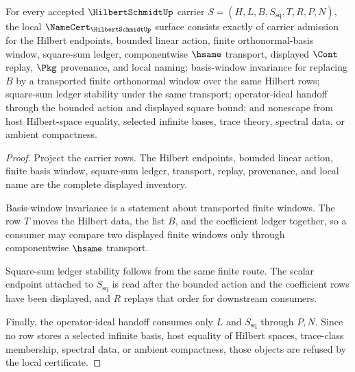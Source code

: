 \begin{theorem}
\label{thm:hilbert-schmidt-namecert-obligations}
For every accepted $\HilbertSchmidtUp$ carrier $S=(H,L,B,S_{\mathrm{sq}},T,R,P,N)$, the local $\NameCert_{\HilbertSchmidtUp}$ surface consists exactly of carrier admission for the Hilbert endpoints, bounded linear action, finite orthonormal-basis window, square-sum ledger, componentwise $\hsame$ transport, displayed $\Cont$ replay, $\Pkg$ provenance, and local naming; basis-window invariance for replacing $B$ by a transported finite orthonormal window over the same Hilbert rows; square-sum ledger stability under the same transport; operator-ideal handoff through the bounded action and displayed square bound; and nonescape from host Hilbert-space equality, selected infinite bases, trace theory, spectral data, or ambient compactness.
\end{theorem}
\begin{proof}
Project the carrier rows. The Hilbert endpoints, bounded linear action, finite basis window, square-sum ledger, transport, replay, provenance, and local name are the complete displayed inventory.

Basis-window invariance is a statement about transported finite windows. The row $T$ moves the Hilbert data, the list $B$, and the coefficient ledger together, so a consumer may compare two displayed finite windows only through componentwise $\hsame$ transport.

Square-sum ledger stability follows from the same finite route. The scalar endpoint attached to $S_{\mathrm{sq}}$ is read after the bounded action and the coefficient rows have been displayed, and $R$ replays that order for downstream consumers.

Finally, the operator-ideal handoff consumes only $L$ and $S_{\mathrm{sq}}$ through $P,N$. Since no row stores a selected infinite basis, host equality of Hilbert spaces, trace-class membership, spectral data, or ambient compactness, those objects are refused by the local certificate.
\end{proof}

